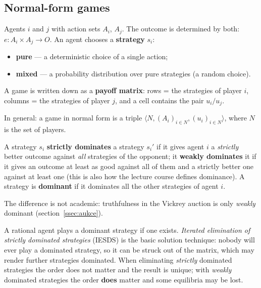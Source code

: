 \documentclass[11pt,a4paper]{article}
\theoremstyle{definition}
\begin{document}
\subsection{Normal-form games}

\begin{defbox}
Agents $i$ and $j$ with action sets $A_i$, $A_j$. The outcome is determined by both:
$e : A_i \times A_j \to O$. An agent chooses a \textbf{strategy} $s_i$:
\begin{itemize}
\item \textbf{pure} --- a deterministic choice of a single action;
\item \textbf{mixed} --- a probability distribution over pure strategies (a random choice).
\end{itemize}
A game is written down as a \textbf{payoff matrix}: rows = the strategies of player $i$,
columns = the strategies of player $j$, and a cell contains the pair $u_i / u_j$.

In general: a game in normal form is a triple $\langle N, (A_i)_{i \in N}, (u_i)_{i \in N}\rangle$,
where $N$ is the set of players.
\end{defbox}

\begin{defbox}[Dominance]
A strategy $s_i$ \textbf{strictly dominates} a strategy $s_i'$ if it gives agent $i$ a
\emph{strictly} better outcome against \emph{all} strategies of the opponent;
it \textbf{weakly dominates} it if it gives an outcome at least as good against all of them and a
strictly better one against at least one (this is also how the lecture course defines dominance). A
strategy is \textbf{dominant} if it dominates all the other strategies of agent $i$.

The difference is not academic: truthfulness in the Vickrey auction is only \emph{weakly} dominant
(section~\ref{ssec:aukce}).

A rational agent plays a dominant strategy if one exists. \emph{Iterated elimination of strictly
dominated strategies} (IESDS) is the basic solution technique: nobody will ever play a dominated
strategy, so it can be struck out of the matrix, which may render further strategies dominated.
When eliminating \emph{strictly} dominated strategies the order does not matter and the result is
unique; with \emph{weakly} dominated strategies the order \textbf{does} matter and some equilibria may
be lost.
\end{defbox}
\end{document}
